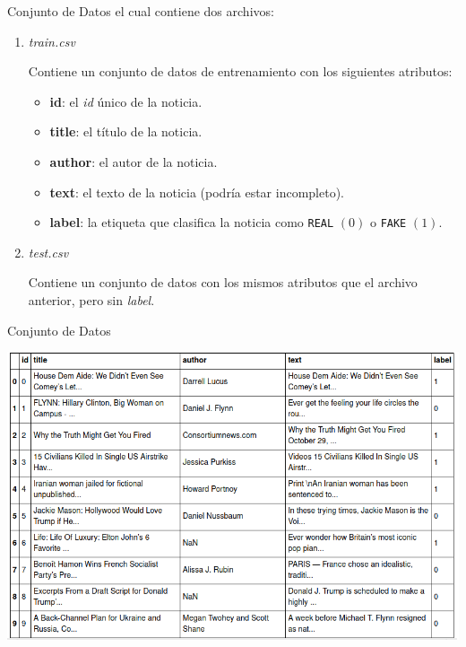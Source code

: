 \documentclass[11pt]{beamer}
\begin{document}
\begin{frame}{Conjunto de Datos}
    \justifying
    el cual contiene dos archivos:
    \begin{enumerate}
        \item \textit{train.csv}
        
        Contiene un conjunto de datos de entrenamiento con los siguientes 
        atributos:
        \begin{itemize}
            \item \textbf{id}: el \textit{id} único de la noticia.
            \item \textbf{title}:  el título de la noticia.
            \item \textbf{author}: el autor de la noticia.
            \item \textbf{text}: el texto de la noticia (podría estar 
            incompleto). 
            \item \textbf{label}: la etiqueta que clasifica la noticia 
            como \texttt{REAL} $(0)$ o \texttt{FAKE} $(1)$.
        \end{itemize}
        \item \textit{test.csv}
        
        Contiene un conjunto de datos con los mismos atributos que el 
        archivo anterior, pero sin \textit{label}. 
    \end{enumerate}
\end{frame}

\begin{frame}{Conjunto de Datos}
    \begin{center}
        \includegraphics[width=1\textwidth]{imagenes/dataframe.png}
    \end{center}
\end{frame}
\end{document}
